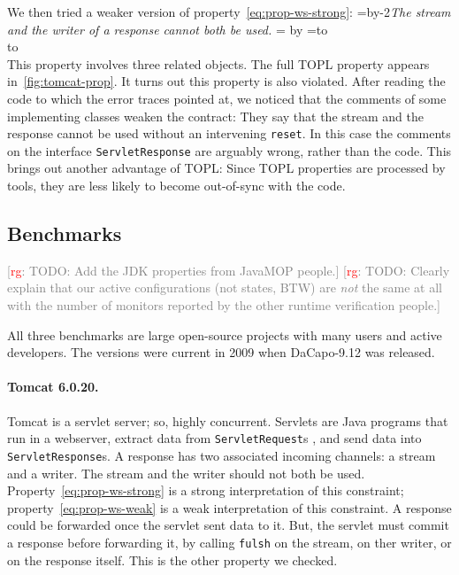 \documentclass[9pt, preprint]{sigplanconf} %
\newcommand{\noterg}[2]{\textcolor{gray}{[\textcolor{red}{#1}: #2]}}
\newcommand{\rg}[1]{\noterg{rg}{#1}}
\newcommand{\quoteindent}{1.5\parindent} %
\newcommand{\eqquote}[2]{{%
  \refstepcounter{equation}\label{#2}%
  \newdimen\qi\qi=\quoteindent
  \setbox0=\vbox{\advance\hsize by-2\qi\noindent\em#1}%
  \newdimen\x\x=\ht0 \advance\x by\dp0%
  \setbox1=\vbox to\x{\vss\hbox{(\arabic{equation})}\vss}%
  \leavevmode\\[1ex]%
  \hbox to\hsize{\hskip\qi\box0\hfil\box1}%
  \\[1ex]}}
\theoremstyle{definition}
\theoremstyle{remark}
\begin{document}
We then tried a weaker version of property~\eqref{eq:prop-ws-strong}:
\eqquote{The stream and the writer of a response cannot both be used.}
{eq:prop-ws-weak}
This property involves three related objects.
The full TOPL property appears in~\autoref{fig:tomcat-prop}.
It turns out this property is also violated.
After reading the code to which the error traces pointed at, we noticed that the comments of some implementing classes weaken the contract:
They say that the stream and the response cannot be used without an intervening {\tt reset}.
In this case the comments on the interface {\tt ServletResponse} are arguably wrong, rather than the code.
This brings out another advantage of TOPL:
Since TOPL properties are processed by tools, they are less likely to become out-of-sync with the code.

\subsection{Benchmarks} %

\rg{TODO: Add the JDK properties from JavaMOP people.}
\rg{TODO: Clearly explain that our active configurations (not states, BTW) are \emph{not} the same at all with the number of monitors reported by the other runtime verification people.}

All three benchmarks are large open-source projects with many users and active developers.
The versions were current in 2009 when DaCapo-9.12 was released.

\paragraph{Tomcat 6.0.20.}
Tomcat is a servlet server; so, highly concurrent.
Servlets are Java programs that run in a webserver, extract data from {\tt ServletRequest}s , and send data into {\tt ServletResponse}s.
A response has two associated incoming channels: a stream and a writer.
The stream and the writer should not both be used.
Property~\eqref{eq:prop-ws-strong} is a strong interpretation of this constraint;
property~\eqref{eq:prop-ws-weak} is a weak interpretation of this constraint.
A response could be forwarded once the servlet sent data to it.
But, the servlet must commit a response before forwarding it, by calling {\tt fulsh} on the stream, on ther writer, or on the response itself.
This is the other property we checked.
\end{document}
